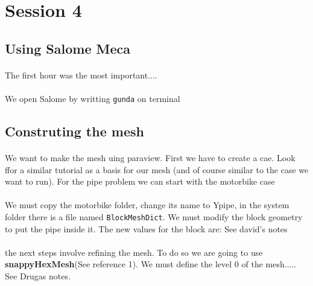 \documentclass[12pt, titlepage]{article}
\begin{document}
\maketitle

\pagebreak


\section{Session 4}


\subsection{Using Salome Meca}
\paragraph{}The first hour was the most important....
\paragraph{}We open Salome by writting \texttt{gunda} on terminal 
\subsection{Construting the mesh}
\paragraph{}We want to make the mesh uing paraview. First we have to create a cae. Look ffor a similar tutorial as a basis for our mesh (and of course similar to the case we want to run). For the pipe problem we can start with the motorbike case

\paragraph{}
We must copy the motorbike folder, change its name to Ypipe, in the system folder there is a file named \texttt{BlockMeshDict}. We must modify the block geometry to put the pipe inside it. The new values for the block are:
See david's notes

\paragraph{}the next steps involve refining the mesh. To do so we are going to use \textbf{snappyHexMesh}(See reference 1). We must define the level 0 of the mesh..... See Drugas notes.
\end{document}
